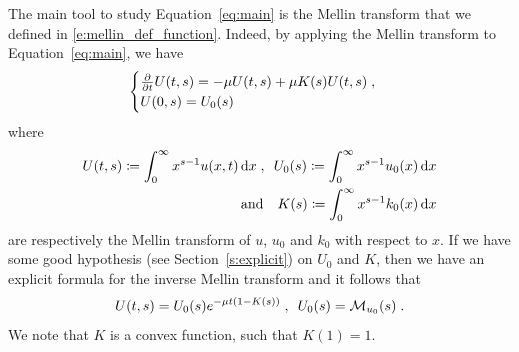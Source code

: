 \documentclass[11pt]{amsart}
\newcommand{\diff}{\,\mathrm{d}}
\newcommand{\ndr}[1]{\textcolor{brown}{[#1]}}
\begin{document}
    The main tool to study Equation~\eqref{eq:main} is the Mellin transform that we defined in \eqref{e:mellin_def_function}. Indeed, by applying the Mellin transform to Equation~\eqref{eq:main}, we have
	\begin{equation*}
        \begin{cases}
		\frac{\partial}{\partial t} U(t,s) = - \mu U(t,s) + \mu K(s) U(t,s)
		\; , \\
        U(0,s) = U_0(s)
    \end{cases}
	\end{equation*}
    where
    \begin{equation*}
        \begin{split}
        U(t,s) \coloneqq \int_0^\infty x^{s-1} u(x,t) \diff x 
        \eqsepv U_0(s) \coloneqq \int_0^\infty x^{s-1} u_0(x) \diff x \\
        \mtext{and} K(s) \coloneqq \int_0^\infty x^{s-1} k_0(x) \diff x 
        \end{split}
    \end{equation*}
    are respectively the Mellin transform of $u$, $u_0$ and $k_0$ with respect to $x$.    
    If we have some good hypothesis (see Section~\ref{s:explicit}) on $U_0$ and $K$, then we have an explicit formula for the inverse Mellin transform and it follows that
    \begin{equation*}
        U(t,s) = U_0(s) e^{-\mu t(1 - K(s) ) }
        \; , \enspace
        U_0(s) = \mathcal{M}_{u_0}(s)
        \; .
    \end{equation*}
    We note that $K$ is a convex function, such that $K(1) = 1$.


\end{document}
